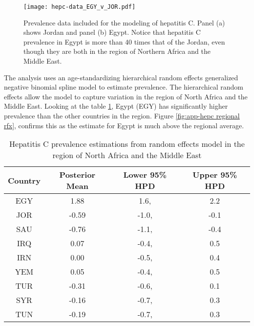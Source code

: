     \begin{figure}[h]
        \begin{center}
            \texttt{[image: hepc-data\_EGY\_v\_JOR.pdf]}
            \caption{Prevalence data included for the modeling of hepatitis C.  Panel (a) shows Jordan and panel (b) Egypt.  Notice that hepatitis C prevalence in Egypt is more than 40 times that of the Jordan, even though they are both in the region of Northern Africa and the Middle East.}
            \label{fig:app-hepc data}
        \end{center}
    \end{figure}

The analysis uses an age-standardizing hierarchical random effects generalized negative binomial spline model to estimate prevalence.  The hierarchical random effects allow the model to capture variation in the region of North Africa and the Middle East.  Looking at the table \ref{tab:hepc regional rfx}, Egypt (EGY) has significantly higher prevalence than the other countries in the region.  Figure \ref{fig:app-hepc regional rfx}, confirms this as the estimate for Egypt is much above the regional average.

\begin{table}[h]
        \begin{center}
        \caption{ Hepatitis C prevalence estimations from random effects model in the region of North Africa and the Middle East}
        \label{tab:hepc regional rfx}
        \begin{tabular}{|c|c|c|c|}
            \hline
                Country & Posterior Mean & Lower 95\% HPD  & Upper 95\%  HPD \\
            \hline
                EGY	&	1.88	&	1.6,	&	2.2	\\
                JOR	&	-0.59	&	-1.0,	&	-0.1	\\
                SAU	&	-0.76	&	-1.1,	&	-0.4	\\
                IRQ	&	0.07	&	-0.4,	&	0.5	\\
                IRN	&	0.00	&	-0.5,	&	0.4	\\
                YEM	&	0.05	&	-0.4,	&	0.5	\\
                TUR	&	-0.31	&	-0.6,	&	0.1	\\
                SYR	&	-0.16	&	-0.7,	&	0.3	\\
                TUN	&	-0.19	&	-0.7,	&	0.3	\\
            \hline
        \end{tabular}
        \end{center}
    \end{table}

